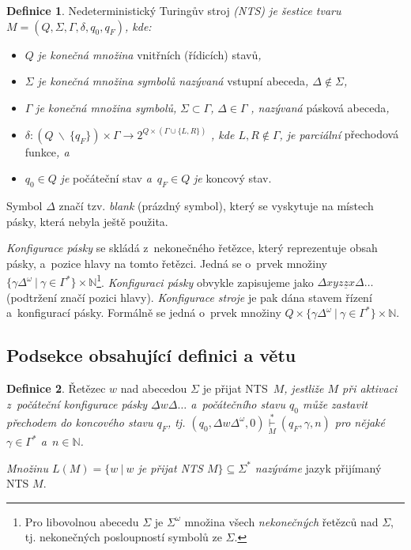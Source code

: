 \documentclass[11pt, a4paper, twocolumn]{article}
\begin{document}
\theoremstyle{definition}
\newtheorem{defn}{Definice}
\begin{defn}Nedeterministický Turingův stroj \emph{(NTS) je šestice tvaru  $M = (Q,\Sigma,\Gamma,\delta,q_{0},q_{F})$, kde:} 
\begin{itemize}
    \item $Q$ \emph{je konečná množina} vnitřních (řídicích) stavů\emph{,}
    \item $\Sigma$ \emph{je konečná množina symbolů nazývaná} vstupní abeceda\emph{, $\Delta \not\in \Sigma$,}
    \item $\Gamma$ \emph{je konečná množina symbolů,} $\Sigma \subset \Gamma$\emph{,} $\Delta \in \Gamma$ \emph{, nazývaná} pásková abeceda\emph{,}
    \item $\delta : (Q\ \backslash\ \{q_{F}\})\times \Gamma \rightarrow 2^{Q\times(\Gamma\cup\{L,R\})}$ \emph{, kde $L, R \not\in \Gamma$, je parciální} přechodová funkce\emph{, a}
    \item $q_{0} \in  Q$ \emph{je} počáteční stav \emph{a}~$q_{F} \in  Q$ \emph{je} koncový stav.
\end{itemize}
\end{defn}
Symbol $\Delta$ značí tzv. \emph{blank} (prázdný symbol), který se vyskytuje na místech pásky, která nebyla ještě použita.

\emph{Konfigurace pásky} se skládá z~nekonečného řetězce, který reprezentuje obsah pásky, a~pozice hlavy na tomto řetězci. Jedná se o~prvek množiny $\{\gamma\Delta^{\omega}\ |\ \gamma\in\Gamma^{*}\}\times\mathbb{N}$\footnote{Pro libovolnou abecedu $\Sigma$ je $\Sigma^{\omega}$ množina všech \emph{nekonečných} řetězců nad $\Sigma$, tj. nekonečných posloupností symbolů ze $\Sigma$.}. \emph{Konfiguraci pásky} obvykle zapisujeme jako ${\Delta xyz\underline{z}x\Delta\dots}$ (podtržení značí pozici hlavy). \emph{Konfigurace stroje} je pak dána stavem řízení a~konfigurací pásky. Formálně se jedná o~prvek množiny $Q \times \{\gamma\Delta^{\omega}\ | \  \gamma\in\Gamma^{*}\}\times\mathbb{N}$.

\subsection{Podsekce obsahující definici a větu}
\begin{defn}\label{def}Řetězec $w$ nad abecedou $\Sigma$ je přijat NTS~$M$\emph{,} \emph{jestliže $M$ při aktivaci z~počáteční konfigurace pásky $\underline{\Delta}w\Delta\dots$ a~počátečního stavu $q_{0}$ může zastavit přechodem do koncového stavu $q_{F}$, tj. $(q_{0},\Delta w\Delta^{\omega},0) \underset{M}{\overset{*}{\vdash}} (q_{F},\gamma,n)$ pro nějaké $\gamma\in\Gamma^{*}$ a~$n\in\mathbb{N}$.}

\emph{Množinu $L(M) = \{w\ |\ w$ je přijat NTS $M\} \subseteq \Sigma^{*}$ nazýváme} jazyk přijímaný NTS $M$.
\end{defn}
\end{document}
